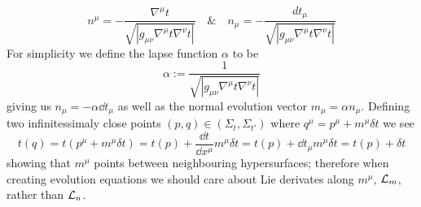 \begin{equation} n^\mu = -\frac{\nabla^\mu t}{\sqrt{|g_{\mu\nu}\nabla^\mu t \nabla^\nu t|}} \quad \& \quad  n_\mu = -\frac{dt_\mu}{\sqrt{|g_{\mu\nu}\nabla^\mu t \nabla^\nu t|}}\end{equation}
For simplicity we define the lapse function $\alpha$ to be
\begin{equation}\alpha :=  \frac{1}{\sqrt{|g_{\mu\nu}\nabla^\mu t \nabla^\nu t|}} \end{equation}
giving us $n_\mu = -\alpha \dd t_\mu$ as well as the normal evolution vector $m_\mu = \alpha n_\mu$. Defining two infinitessimaly close points $(p,q)\in(\Sigma_t,\Sigma_{t'})$ where $ q^\mu = p^\mu + m^\mu\delta t$ we see
\[ t(q) = t(p^\mu +  m^\mu\delta t) = t(p) + \frac{\dd t}{\dd x^\mu}m^\mu\delta t = t(p) + \dd t_\mu m^\mu \delta t =  t(p) + \delta t\] 
showing that $m^\mu$ points between neighbouring hypersurfaces; therefore when creating evolution equations we should care about Lie derivates along $m^\mu$, $\mathcal{L}_m$, rather than $\mathcal{L}_n$.



